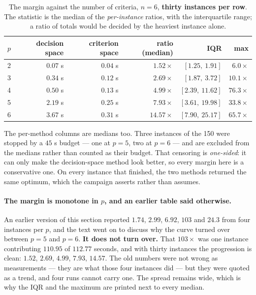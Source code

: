 \documentclass[11pt,a4paper]{article}
\begin{document}
\begin{table}[h]
\centering
\caption{The margin against the number of criteria, $n = 6$, \textbf{thirty
instances per row}.  The statistic is the median of the \emph{per-instance}
ratios, with the interquartile range; a ratio of totals would be decided by the
heaviest instance alone.}
\label{tab:margin}
\begin{tabular}{crrrrr}
\toprule
$p$ & decision space & criterion space & ratio (median) & IQR & max \\
\midrule
2 & $0.07$ s & $0.04$ s & $1.52\times$ & $[1.25,\ 1.91]$ & $6.0\times$ \\
3 & $0.34$ s & $0.12$ s & $2.69\times$ & $[1.87,\ 3.72]$ & $10.1\times$ \\
4 & $0.50$ s & $0.13$ s & $4.99\times$ & $[2.39,\ 11.62]$ & $76.3\times$ \\
5 & $2.19$ s & $0.25$ s & $7.93\times$ & $[3.61,\ 19.98]$ & $33.8\times$ \\
6 & $3.67$ s & $0.31$ s & $14.57\times$ & $[7.90,\ 25.17]$ & $65.7\times$ \\
\bottomrule
\end{tabular}
\end{table}

\noindent
The per-method columns are medians too.  Three instances of the 150 were
stopped by a $45$ s budget --- one at $p=5$, two at $p=6$ --- and are excluded
from the medians rather than counted as their budget.  That censoring is
\emph{one-sided}: it can only make the decision-space method look better, so
every margin here is a conservative one.  On every instance that finished, the
two methods returned the same optimum, which the campaign asserts rather than
assumes.

\paragraph{The margin is monotone in $p$, and an earlier table said otherwise.}
An earlier version of this section reported $1.74$, $2.99$, $6.92$, $103$ and
$24.3$ from four instances per $p$, and the text went on to discuss why the
curve turned over between $p=5$ and $p=6$.  \textbf{It does not turn over.}
That $103\times$ was one instance contributing $110.95$ of $112.77$ seconds,
and with thirty instances the progression is clean: $1.52$, $2.69$, $4.99$,
$7.93$, $14.57$.  The old numbers were not wrong as measurements --- they are
what those four instances did --- but they were quoted as a trend, and four
runs cannot carry one.  The spread remains wide, which is why the IQR and the
maximum are printed next to every median.
\end{document}
